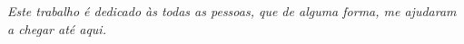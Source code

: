\begin{dedicatoria}
   \vspace*{\fill}
   \centering
   \noindent
   \textit{Este trabalho é dedicado às todas as pessoas, que de alguma forma, me
   ajudaram a chegar até aqui.} \vspace*{\fill}
\end{dedicatoria}
